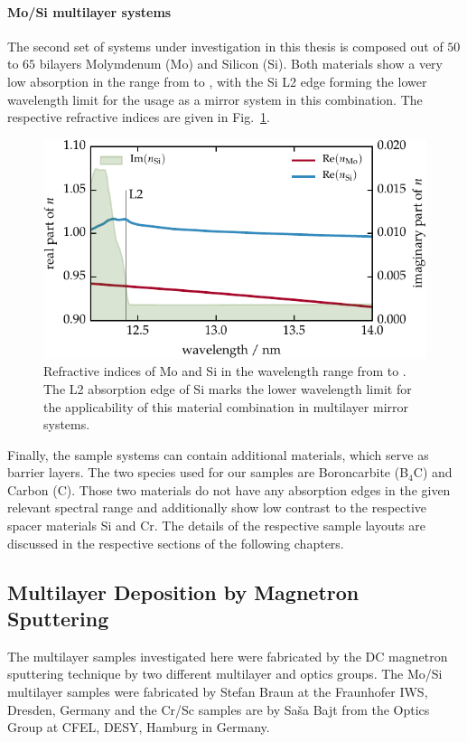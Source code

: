 \paragraph{Mo/Si multilayer systems}
The second set of systems under investigation in this thesis is composed out of $50$ to $65$ bilayers Molymdenum (Mo) and Silicon (Si). Both materials show a very low absorption in the range from  to , with the Si L2 edge forming the lower wavelength limit for the usage as a mirror system in this combination. The respective refractive indices are given in Fig.~\ref{ch_exp:fig_mosi_contrast}.
\begin{figure}[htb]
        \includegraphics{img/Mo_Si_contrast}
        \caption[Refractive indices of Mo and Si in the wavelength range from  to .]{%
            Refractive indices of Mo and Si in the wavelength range from  to . The L2 absorption edge of Si marks the lower wavelength limit for the applicability of this material combination in multilayer mirror systems.}
        \label{ch_exp:fig_mosi_contrast}
\end{figure}

Finally, the sample systems can contain additional materials, which serve as barrier layers. The two species used for our samples are Boroncarbite (B$_4$C) and Carbon (C). Those two materials do not have any absorption edges in the given relevant spectral range and additionally show low contrast to the respective spacer materials Si and Cr. The details of the respective sample layouts are discussed in the respective sections of the following chapters.

\subsection{Multilayer Deposition by Magnetron Sputtering}
The multilayer samples investigated here were fabricated by the DC magnetron sputtering technique \cite{stearns_fabrication_1991} by two different multilayer and optics groups. The Mo/Si multilayer samples were fabricated by Stefan Braun at the Fraunhofer IWS, Dresden, Germany and the Cr/Sc samples are by Sa\v{s}a Bajt from the Optics Group at CFEL, DESY, Hamburg in Germany.


